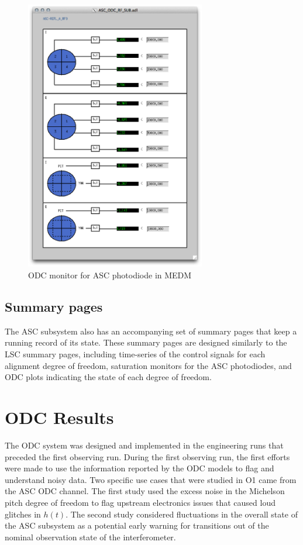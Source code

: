 \begin{figure}[ht!]
\includegraphics[width=0.7\textwidth]{figures/ODC/PD_screen}
\caption[ASC ODC Photodiode Monitor in MEDM]{ODC monitor for ASC photodiode in MEDM}
\label{fig:odc-pd-screen}
\end{figure}

\subsection{Summary pages}

The ASC subsystem also has an accompanying set of summary pages that keep a running 
record of its state. These summary pages are designed similarly to the LSC summary 
pages, including time-series of the control signals for each alignment degree of freedom, 
saturation monitors for the ASC photodiodes,  
and ODC plots indicating the state of each degree of freedom.

\section{ODC Results}

The ODC system was designed and implemented in the engineering runs that preceded the 
first observing run. During the first observing run, the first efforts were made to 
use the information reported by the ODC models to flag and understand noisy data. 
Two specific use cases that were studied in O1 came from the ASC ODC channel. The
first study 
used the excess noise in the Michelson pitch degree of freedom to flag upstream 
electronics issues that caused loud glitches in $h(t)$. The second study considered  
fluctuations in the overall state of the ASC subsystem as a potential early warning 
for transitions out of the nominal observation state of the interferometer. 

